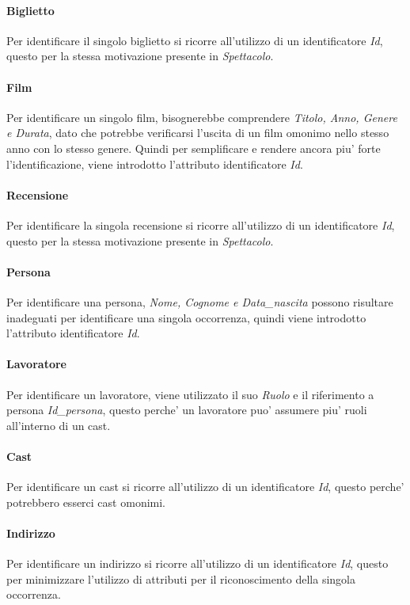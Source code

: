 \documentclass[10pt]{article}
\begin{document}
	\paragraph{Biglietto}
	Per identificare il singolo biglietto si ricorre all'utilizzo di un identificatore \textit{Id}, questo per la stessa motivazione presente in \textit{Spettacolo}.
	\paragraph{Film}
	Per identificare un singolo film, bisognerebbe comprendere \textit{Titolo, Anno, Genere e Durata}, dato che potrebbe verificarsi l'uscita di un film omonimo nello stesso anno con lo stesso genere. Quindi per semplificare e rendere ancora piu' forte l'identificazione, viene introdotto l'attributo identificatore \textit{Id}.
	\paragraph{Recensione}
	Per identificare la singola recensione si ricorre all'utilizzo di un identificatore \textit{Id}, questo per la stessa motivazione presente in \textit{Spettacolo}.
	\paragraph{Persona}
	Per identificare una persona, \textit{Nome, Cognome e Data\_nascita} possono risultare inadeguati per identificare una singola occorrenza, quindi viene introdotto l'attributo identificatore \textit{Id}.
	\paragraph{Lavoratore}
	Per identificare un lavoratore, viene utilizzato il suo \textit{Ruolo} e il riferimento a persona \textit{Id\_persona}, questo perche' un lavoratore puo' assumere piu' ruoli all'interno di un cast.
	\paragraph{Cast}
	Per identificare un cast si ricorre all'utilizzo di un identificatore \textit{Id}, questo perche' potrebbero esserci cast omonimi.
	\paragraph{Indirizzo}
	Per identificare un indirizzo si ricorre all'utilizzo di un identificatore \textit{Id}, questo per minimizzare l'utilizzo di attributi per il riconoscimento della singola occorrenza.
\end{document}
